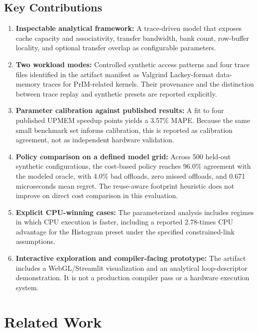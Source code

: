 \documentclass[journal,10pt,twocolumn]{IEEEtran}
\begin{document}
\subsection{Key Contributions}
\begin{enumerate}
    \item \textbf{Inspectable analytical framework:} A trace-driven model that exposes cache capacity and associativity, transfer bandwidth, bank count, row-buffer locality, and optional transfer overlap as configurable parameters.
    \item \textbf{Two workload modes:} Controlled synthetic access patterns and four trace files identified in the artifact manifest as Valgrind Lackey-format data-memory traces for PrIM-related kernels. Their provenance and the distinction between trace replay and synthetic presets are reported explicitly.
    \item \textbf{Parameter calibration against published results:} A fit to four published UPMEM speedup points yields a 3.57\% MAPE. Because the same small benchmark set informs calibration, this is reported as calibration agreement, not as independent hardware validation.
    \item \textbf{Policy comparison on a defined model grid:} Across 500 held-out synthetic configurations, the cost-based policy reaches 96.0\% agreement with the modeled oracle, with 4.0\% bad offloads, zero missed offloads, and 0.671 microseconds mean regret. The reuse-aware footprint heuristic does not improve on direct cost comparison in this evaluation.
    \item \textbf{Explicit CPU-winning cases:} The parameterized analysis includes regimes in which CPU execution is faster, including a reported 2.78-times CPU advantage for the Histogram preset under the specified constrained-link assumptions.
    \item \textbf{Interactive exploration and compiler-facing prototype:} The artifact includes a WebGL/Streamlit visualization and an analytical loop-descriptor demonstration. It is not a production compiler pass or a hardware execution system.
\end{enumerate}

\section{Related Work}
\end{document}
